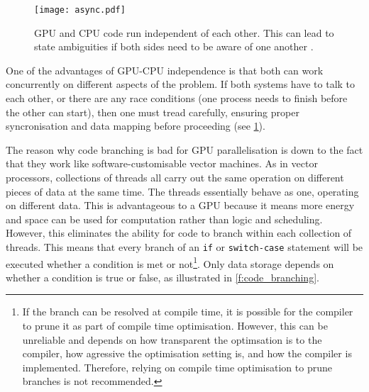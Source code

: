 \begin{figure}
  \centering
  \texttt{[image: async.pdf]}
  \caption[GPU and CPU asynchronous execution.]{GPU and CPU code run independent of each other. This can lead to state ambiguities if both sides need to be aware of one another \cite{nvidia}.}
  \label{f:async_gpu_cpu}
\end{figure}
One of the advantages of GPU-CPU independence is that both can work concurrently on different aspects of the problem. If both systems have to talk to each other, or there are any race conditions (one process needs to finish before the other can start), then one must tread carefully, ensuring proper syncronisation and data mapping before proceeding (see \cref{f:async_gpu_cpu}).

The reason why code branching is bad for GPU parallelisation is down to the fact that they work like software-customisable vector machines. As in vector processors, collections of threads all carry out the same operation on different pieces of data at the same time. The threads essentially behave as one, operating on different data. This is advantageous to a GPU because it means more energy and space can be used for computation rather than logic and scheduling. However, this eliminates the ability for code to branch within each collection of threads. This means that every branch of an \texttt{if} or \texttt{switch-case} statement will be executed whether a condition is met or not\footnote{If the branch can be resolved at compile time, it is possible for the compiler to prune it as part of compile time optimisation. However, this can be unreliable and depends on how transparent the optimsation is to the compiler, how agressive the optimisation setting is, and how the compiler is implemented. Therefore, relying on compile time optimisation to prune branches is not recommended.}. Only data storage depends on whether a condition is true or false, as illustrated in \cref{f:code_branching}.
